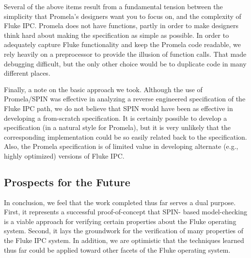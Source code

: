 Several of the above items result from a fundamental tension between
the simplicity that Promela's designers want you to focus on, and the
complexity of Fluke IPC.  Promela does not have functions, partly in
order to make designers think hard about making the specification as
simple as possible.  In order to adequately capture Fluke
functionality and keep the Promela code readable, we rely heavily on
a preprocessor to provide the illusion of function calls.  That made
debugging difficult, but the only other choice would be to duplicate 
code in many different places.

Finally, a note on the basic approach we took.  Although the use of
Promela/SPIN was effective in analyzing a reverse engineered
specification of the Fluke IPC path, we do not believe that SPIN would
have been as effective in developing a from-scratch specification.  It
is certainly possible to develop a specification (in a natural style
for Promela), but it is very unlikely that the corresponding
implementation could be so easily related back to the specification.
Also, the Promela specification is of limited value in developing
alternate (e.g., highly optimized) versions of Fluke IPC.

\subsection{Prospects for the Future}

In conclusion, we feel that the work completed thus far serves a dual
purpose.  First, it represents a successful proof-of-concept that
SPIN- based model-checking is a viable approach for verifying certain
properties about the Fluke operating system.  Second, it lays the
groundwork for the verification of many properties of the Fluke IPC
system.  In addition, we are optimistic that the techniques learned
thus far could be applied toward other facets of the Fluke operating
system.
